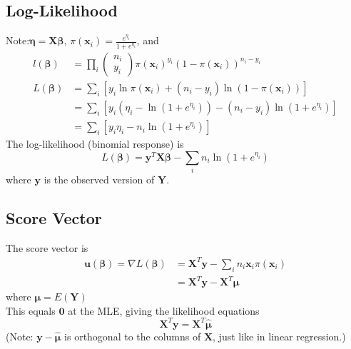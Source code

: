 \documentclass[11pt]{elegantbook}
\begin{document}
\subsection*{Log-Likelihood}
Note:$\boldsymbol{\eta}=\boldsymbol{X} \boldsymbol{\beta}$, $\pi\left(\boldsymbol{x}_i\right)=\frac{e^{\eta_i}}{1+e^{\eta_i}}$, and
\begin{equation}
    \begin{aligned}
        l(\boldsymbol{\beta})&=\prod_{i}\begin{pmatrix}
            n_i\\
            y_i
        \end{pmatrix} \pi\left(\boldsymbol{x}_i\right)^{y_i} (1-\pi\left(\boldsymbol{x}_i\right))^{n_i-y_i}\\
        L(\boldsymbol{\beta})&=\sum_{i}\left[ y_i\ln\pi\left(\boldsymbol{x}_i\right)+(n_i-y_i)\ln(1-\pi\left(\boldsymbol{x}_i\right))\right]\\
        &=\sum_{i}\left[ y_i(\eta_i-\ln\left(1+e^{\eta_i}\right))-(n_i-y_i)\ln\left(1+e^{\eta_i}\right)\right]\\
        &=\sum_{i}\left[y_i\eta_i-n_i\ln\left(1+e^{\eta_i}\right)\right]
    \end{aligned}
    \nonumber
\end{equation}
The log-likelihood (binomial response) is
$$
L(\boldsymbol{\beta})=\boldsymbol{y}^T \boldsymbol{X} \boldsymbol{\beta}-\sum_i n_i \ln \left(1+e^{\eta_i}\right)
$$
where $\boldsymbol{y}$ is the observed version of $\boldsymbol{Y}$.

\subsection*{Score Vector}
The score vector is
$$
\begin{aligned}
\boldsymbol{u}(\boldsymbol{\beta})=\nabla L(\boldsymbol{\beta}) & =\boldsymbol{X}^T \boldsymbol{y}-\sum_i n_i \boldsymbol{x}_i \pi\left(\boldsymbol{x}_i\right) \\
& =\boldsymbol{X}^T \boldsymbol{y}-\boldsymbol{X}^T \boldsymbol{\mu}
\end{aligned}
$$
where $\boldsymbol{\mu}=E(\boldsymbol{Y})$\\
This equals $\mathbf{0}$ at the MLE, giving the likelihood equations
$$
\boldsymbol{X}^T \boldsymbol{y}=\boldsymbol{X}^T \hat{\boldsymbol{\mu}}
$$
(Note: $\boldsymbol{y}-\hat{\boldsymbol{\mu}}$ is orthogonal to the columns of $\boldsymbol{X}$, just like in linear regression.)
\end{document}
